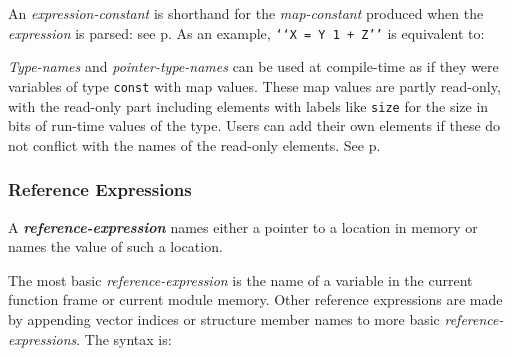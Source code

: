 \documentclass[12pt]{article}
\newcommand{\TT}[1]{{\tt \bfseries #1}}
\newcommand{\emkey}[1]{{\em \bfseries #1}}
\newcommand{\pagref}[1]{p\pageref{#1}}
\begin{document}
An {\em expression-constant} is shorthand for the {\em map-constant}
produced when the {\em expression} is parsed: see \pagref{PARSER-OUTPUT}.
As an example, {\tt `{}`X = Y 1 + Z'{}'} is equivalent to: \\
\hspace*{0.5in}\TT{\{"X", "=", \{\{"Y", 1\}, "+", "Z"\}\}}

{\em Type-names} and {\em pointer-type-names} can be used at
compile-time as if they were variables of type {\tt const}
with map values.  These map values are partly read-only,
with the read-only part including elements with labels like
{\tt size} for the size in bits of run-time values of the type.
Users can add their own elements if these do not conflict
with the names of the read-only elements.  See \pagref{TYPE-MAPS}.

\subsubsection{Reference Expressions}
\label{REFERENCE-EXPRESSIONS}

A \emkey{reference-expression} names either a pointer to a location in memory
or names the value of such a location.

The most basic {\em reference-expression} is the name of a variable
in the current function frame or current module memory.  Other
reference expressions are made by appending vector indices or structure
member names to more basic {\em reference-expressions}.  The syntax
is:
\end{document}
